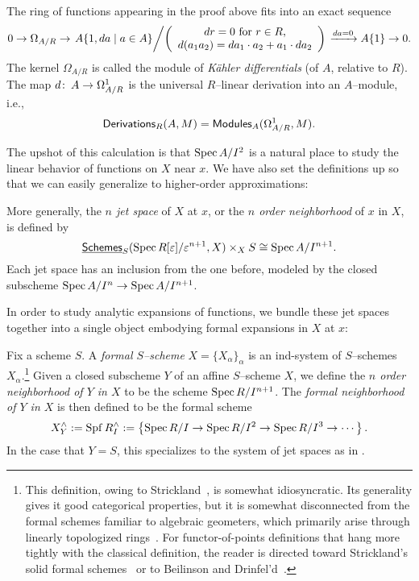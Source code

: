 \begin{definition}
The ring of functions appearing in the proof above fits into an exact sequence \[0 \to \Omega_{A/R} \to \left. A\{1, da \mid a \in A\} \middle/ \left( \begin{array}{c} \text{$dr = 0$ for $r \in R$}, \\ d(a_1 a_2) = da_1 \cdot a_2 + a_1 \cdot da_2 \end{array} \right) \right. \xrightarrow{da = 0} A\{1\} \to 0.\]  The kernel $\Omega_{A/R}$ is called the module of \textit{K\"ahler differentials} (of $A$, relative to $R$).  The map $d\colon\thinspace A\to \Omega^1_{A/R}$ is the universal $R$--linear derivation into an $A$--module, i.e., \[\mathsf{Derivations}_R(A, M) = \mathsf{Modules}_A(\Omega^1_{A/R}, M).\]
\end{definition}

The upshot of this calculation is that $\operatorname{Spec} A/I^2$ is a natural place to study the linear behavior of functions on $X$ near $x$.  We have also set the definitions up so that we can easily generalize to higher-order approximations:
\begin{definition}\label{JetSpacesDefn}
More generally, the \textit{$n${\th} jet space} of $X$ at $x$, or the \textit{$n${\th} order neighborhood} of $x$ in $X$, is defined by \[\operatorname{\underline{\smash{\mathsf{Schemes}}}}_S(\operatorname{Spec} R[\varepsilon] / \varepsilon^{n+1}, X) \times_X S \cong \operatorname{Spec} A / I^{n+1}.\]  Each jet space has an inclusion from the one before, modeled by the closed subscheme $\operatorname{Spec} A/I^n \to \operatorname{Spec} A / I^{n+1}$.
\end{definition}

In order to study analytic expansions of functions, we bundle these jet spaces together into a single object embodying formal expansions in $X$ at $x$:
\begin{definition}\label{DefnCompletion}
Fix a scheme $S$.  A \textit{formal $S$--scheme} $X = \{X_\alpha\}_\alpha$ is an ind-system of $S$--schemes $X_\alpha$.\footnote{This definition, owing to Strickland~\cite[Definition 4.1]{StricklandFSFG}, is somewhat idiosyncratic.  Its generality gives it good categorical properties, but it is somewhat disconnected from the formal schemes familiar to algebraic geometers, which primarily arise through linearly topologized rings~\cite[pg.\ 194]{Hartshorne}.  For functor-of-points definitions that hang more tightly with the classical definition, the reader is directed toward Strickland's solid formal schemes~\cite[Section 4.2]{StricklandFSFG} or to Beilinson and Drinfel'd~\cite[Section 7.11.1]{BeilinsonDrinfeld}.}  Given a closed subscheme $Y$ of an affine $S$--scheme $X$, we define the \textit{$n${\th} order neighborhood of $Y$ in $X$} to be the scheme $\operatorname{Spec} R/I^{n+1}$.  The \textit{formal neighborhood of $Y$ in $X$} is then defined to be the formal scheme \[X^\wedge_Y := \operatorname{Spf} R^\wedge_I := \left\{ \operatorname{Spec} R/I \to \operatorname{Spec} R/I^2 \to \operatorname{Spec} R/I^3 \to \cdots \right\}.\]  In the case that $Y = S$, this specializes to the system of jet spaces as in .
\end{definition}

